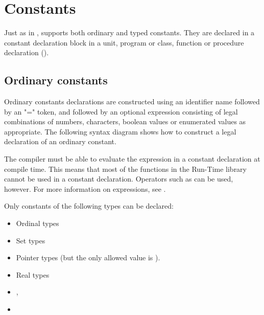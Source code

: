 \chapter{Constants}
 
Just as in \tp, \fpc supports both ordinary and typed constants. They are
declared in a constant declaration block in a unit, program or class, function or
procedure declaration ().

\section{Ordinary constants}
 
Ordinary constants declarations are constructed using an identifier name 
followed by an "=" token, and followed by an optional expression consisting 
of legal combinations of numbers, characters, boolean values or enumerated 
values as appropriate. The following syntax diagram shows how to construct 
a legal declaration of an ordinary constant.


The compiler must be able to evaluate the expression in a constant
declaration at compile time.  This means that most of the functions
in the Run-Time library cannot be used in a constant
declaration.
Operators such as  can be used, however. 
For more information on expressions, see .

Only constants of the following types can be declared:

\begin{itemize}
\item Ordinal types
\item Set types
\item Pointer types (but the only allowed value is ).
\item Real types
\item {},
\item {}
\end{itemize}

